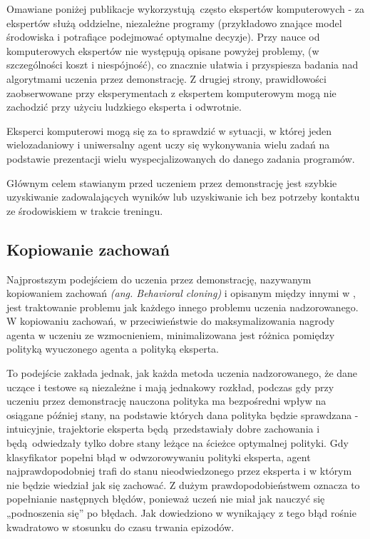 \documentclass[polish,master,a4paper,oneside]{ppfcmthesis}
\begin{document}
Omawiane poniżej publikacje wykorzystują często ekspertów komputerowych - za ekspertów służą oddzielne, niezależne programy (przykładowo znające model środowiska i potrafiące podejmować optymalne decyzje). Przy nauce od komputerowych ekspertów nie występują opisane powyżej problemy, (w szczególności koszt i niespójność), co znacznie ułatwia i przyspiesza badania nad algorytmami uczenia przez demonstrację. Z drugiej strony, prawidłowości zaobserwowane przy eksperymentach z ekspertem komputerowym mogą nie zachodzić przy użyciu ludzkiego eksperta i odwrotnie.

Eksperci komputerowi mogą się za to sprawdzić w sytuacji, w której jeden wielozadaniowy i uniwersalny agent uczy się wykonywania wielu zadań na podstawie prezentacji wielu wyspecjalizowanych do danego zadania programów.

Głównym celem stawianym przed uczeniem przez demonstrację jest szybkie uzyskiwanie zadowalających wyników lub uzyskiwanie ich bez potrzeby kontaktu ze środowiskiem w trakcie treningu.

\subsection{Kopiowanie zachowań}\label{bcloning}

Najprostszym podejściem do uczenia przez demonstrację, nazywanym kopiowaniem zachowań \textit{(ang. Behavioral cloning)} i opisanym między innymi w \cite{Schaal99isimitation}, jest traktowanie problemu jak każdego innego problemu uczenia nadzorowanego. W kopiowaniu zachowań, w przeciwieństwie do maksymalizowania nagrody agenta w uczeniu ze wzmocnieniem, minimalizowana jest różnica pomiędzy polityką wyuczonego agenta a polityką eksperta.

To podejście zakłada jednak, jak każda metoda uczenia nadzorowanego, że dane uczące i testowe są niezależne i mają jednakowy rozkład, podczas gdy przy uczeniu przez demonstrację nauczona polityka ma bezpośredni wpływ na osiągane później stany, na podstawie których dana polityka będzie sprawdzana - intuicyjnie, trajektorie eksperta będą przedstawiały dobre zachowania i będą odwiedzały tylko dobre stany leżące na ścieżce optymalnej polityki. Gdy klasyfikator popełni błąd w odwzorowywaniu polityki eksperta, agent najprawdopodobniej trafi do stanu nieodwiedzonego przez eksperta i w którym nie będzie wiedział jak się zachować. Z dużym prawdopodobieństwem oznacza to popełnianie następnych błędów, ponieważ uczeń nie miał jak nauczyć się „podnoszenia się” po błędach. Jak dowiedziono w \cite{bagnell2010efficient} wynikający z tego błąd rośnie kwadratowo w stosunku do czasu trwania epizodów.
\end{document}
